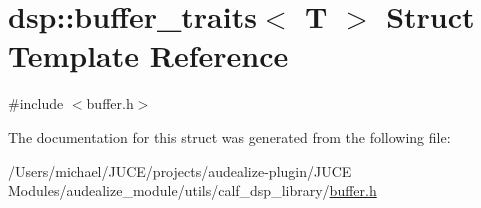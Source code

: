 \hypertarget{structdsp_1_1buffer__traits}{}\section{dsp\+:\+:buffer\+\_\+traits$<$ T $>$ Struct Template Reference}
\label{structdsp_1_1buffer__traits}


{\ttfamily \#include $<$buffer.\+h$>$}



The documentation for this struct was generated from the following file\+:\begin{DoxyCompactItemize}
\item 
/\+Users/michael/\+J\+U\+C\+E/projects/audealize-\/plugin/\+J\+U\+C\+E Modules/audealize\+\_\+module/utils/calf\+\_\+dsp\+\_\+library/\hyperlink{buffer_8h}{buffer.\+h}\end{DoxyCompactItemize}
